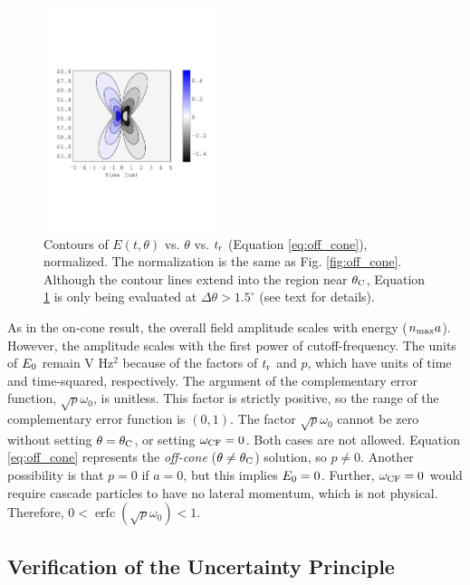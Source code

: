 \documentclass[amsmath,amssymb,aps,prd,10pt,twocolumn]{revtex4}
\DeclareMathOperator\erfc{erfc}
\begin{document}
\begin{figure}
\centering
\includegraphics[width=0.45\textwidth,trim=0cm 6cm 0cm 6cm,clip=true]{May5_plot3.pdf}
\caption{\label{fig:off_cone2} Contours of $E(t,\theta)$ vs. $\theta$ vs. $t_{\rm r}$ (Equation \ref{eq:off_cone}), normalized.  The normalization is the same as Fig. \ref{fig:off_cone}.  Although the contour lines extend into the region near $\theta_{\rm C}$, Equation \ref{fig:off_cone2} is only being evaluated at $\Delta \theta > 1.5^{\circ}$ (see text for details).}
\end{figure}

As in the on-cone result, the overall field amplitude scales with energy ($n_{\rm max} a$).  However, the amplitude scales with the first power of cutoff-frequency.  The units of $E_{\rm 0}$ remain V Hz$^2$ because of the factors of $t_{\rm r}$ and $p$, which have units of time and time-squared, respectively.  The argument of the complementary error function, $\sqrt{p}\omega_0$, is unitless.  This factor is strictly positive, so the range of the complementary error function is $(0,1)$.  The factor $\sqrt{p}\omega_0$ cannot be zero without setting $\theta = \theta_{\rm C}$, or setting $\omega_{\rm CF} = 0$.  Both cases are not allowed.  Equation \ref{eq:off_cone} represents the \textit{off-cone} ($\theta \neq \theta_{\rm C}$) solution, so $p \neq 0$.  Another possibility is that $p = 0$ if $a = 0$, but this implies $E_{\rm 0}=0$.  Further, $\omega_{\rm CF} = 0$ would require cascade particles to have no lateral momentum, which is not physical.  Therefore, $0 < \erfc(\sqrt{p}\omega_0) < 1$.

\subsection{Verification of the Uncertainty Principle}
\label{sec:sigma}
\end{document}
